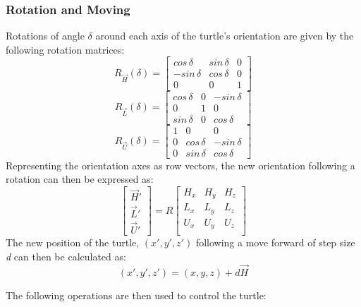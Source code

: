 \documentclass[12pt]{article}
\begin{document}
\subsubsection{Rotation and Moving}
Rotations of angle \(\delta\) around each axis of the turtle's orientation are given by the following rotation matrices:
\begin{equation*}
R_{\vec{H}}(\delta) = \begin{bmatrix}cos\,\delta&sin\,\delta&0\\-sin\,\delta&cos\,\delta&0\\0&0&1 \end{bmatrix}
\end{equation*}
\begin{equation*}
R_{\vec{L}}(\delta) = \begin{bmatrix}cos\,\delta&0&-sin\,\delta\\0&1&0\\sin\,\delta&0&cos\,\delta \end{bmatrix}
\end{equation*}
\begin{equation*}
R_{\vec{U}}(\delta) = \begin{bmatrix}1&0&0\\0&cos\,\delta&-sin\,\delta\\0&sin\,\delta&cos\,\delta \end{bmatrix}
\end{equation*}
Representing the orientation axes as row vectors, the new orientation following a rotation can then be expressed as:
\begin{equation}
\begin{bmatrix} \vec{H}' \\ \vec{L}' \\ \vec{U}' \end{bmatrix}=R
\begin{bmatrix}
	H_{x} & H_{y} & H_{z}\\
	L_{x} & L_{y} & L_{z}\\
	U_{x} & U_{y} & U_{z}\\
\end{bmatrix}
\end{equation}
The new position of the turtle, \((x', y', z')\) following a move forward of step size \textit{d} can then be calculated as:
\begin{equation}
	(x', y', z') = (x, y, z) + d\vec{H}
\end{equation}

The following operations are then used to control the turtle:
\end{document}
